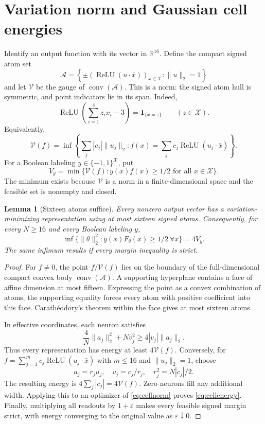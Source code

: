 \documentclass[11pt]{article}
\newtheorem{lemma}[theorem]{Lemma}
\theoremstyle{remark}\newtheorem{remark}[theorem]{Remark}
\newcommand{\relu}{\operatorname{ReLU}}
\newcommand{\R}{\mathbb R}
\newcommand{\X}{\mathcal X}
\newcommand{\V}{\mathcal V}
\newcommand{\1}{\mathbf 1}
\begin{document}
\section{Variation norm and Gaussian cell energies}
Identify an output function with its vector in $\R^{16}$. Define the compact signed atom set
\[
\mathcal A=\left\{\pm(\relu(u\cdot\bar x))_{x\in\X}:\|u\|_2=1\right\}
\]
and let $\V$ be the gauge of $\operatorname{conv}(\mathcal A)$. This is a norm: the signed atom hull is symmetric, and point indicators lie in its span. Indeed,
\[
\relu\!\left(\sum_{i=1}^4z_ix_i-3\right)=\1_{\{x=z\}}
\qquad(z\in\X).
\]
Equivalently,
\[
\V(f)=\inf\left\{\sum_j|c_j|\|u_j\|_2:
f(x)=\sum_jc_j\relu(u_j\cdot\bar x)\right\}.
\]
For a Boolean labeling $y\in\{-1,1\}^{\X}$, put
\[
V_y=\min\{\V(f): y(x)f(x)\ge1/2\text{ for all }x\in\X\}.
\tag{5}\label{eq:cellnorm}
\]
The minimum exists because $\V$ is a norm in a finite-dimensional space and the feasible set is nonempty and closed.

\begin{lemma}[Sixteen atoms suffice]\label{lem:width}
Every nonzero output vector has a variation-minimizing representation using at most sixteen signed atoms. Consequently, for every $N\ge16$ and every Boolean labeling $y$,
\[
\inf\{\|\theta\|_2^2:y(x)F_\theta(x)\ge1/2\ \forall x\}=4V_y.
\tag{6}\label{eq:cellenergy}
\]
The same infimum results if every margin inequality is strict.
\end{lemma}
\begin{proof}
For $f\ne0$, the point $f/\V(f)$ lies on the boundary of the full-dimensional compact convex body $\operatorname{conv}(\mathcal A)$. A supporting hyperplane contains a face of affine dimension at most fifteen. Expressing the point as a convex combination of atoms, the supporting equality forces every atom with positive coefficient into this face. Carath\'eodory's theorem within the face gives at most sixteen atoms.

In effective coordinates, each neuron satisfies
\[
\frac4N\|a_j\|_2^2+Nv_j^2\ge4|v_j|\|a_j\|_2.
\]
Thus every representation has energy at least $4\V(f)$. Conversely, for $f=\sum_{j=1}^m c_j\relu(u_j\cdot\bar x)$ with $m\le16$ and $\|u_j\|_2=1$, choose
\[
a_j=r_ju_j,\quad v_j=c_j/r_j,\quad r_j^2=N|c_j|/2.
\]
The resulting energy is $4\sum_j|c_j|=4\V(f)$. Zero neurons fill any additional width. Applying this to an optimizer of \eqref{eq:cellnorm} proves \eqref{eq:cellenergy}. Finally, multiplying all readouts by $1+\varepsilon$ makes every feasible signed margin strict, with energy converging to the original value as $\varepsilon\downarrow0$.
\end{proof}
\end{document}
